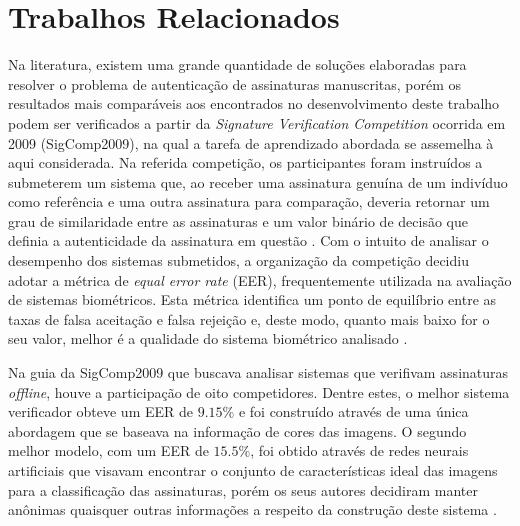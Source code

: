 
\chapter{Trabalhos Relacionados} \label{cap:trab-rel}

Na literatura, existem uma grande quantidade de soluções elaboradas para resolver o problema de autenticação de assinaturas manuscritas, porém os resultados mais comparáveis aos encontrados no desenvolvimento deste trabalho podem ser verificados a partir da \emph{Signature Verification Competition} ocorrida em 2009 (SigComp2009), na qual a tarefa de aprendizado abordada se assemelha à aqui considerada. Na referida competição, os participantes foram instruídos a submeterem um sistema que, ao receber uma assinatura genuína de um indivíduo como referência e uma outra assinatura para comparação, deveria retornar um grau de similaridade entre as assinaturas e um valor binário de decisão que definia a autenticidade da assinatura em questão \cite{icdar2009}. Com o intuito de analisar o desempenho dos sistemas submetidos, a organização da competição decidiu adotar a métrica de \emph{equal error rate} (EER), frequentemente utilizada na avaliação de sistemas biométricos. Esta métrica identifica um ponto de equilíbrio entre as taxas de falsa aceitação e falsa rejeição e, deste modo, quanto mais baixo for o seu valor, melhor é a qualidade do sistema biométrico analisado \cite{capsi}.

Na guia da SigComp2009 que buscava analisar sistemas que verifivam assinaturas \emph{offline}, houve a participação de oito competidores. Dentre estes, o melhor sistema verificador obteve um EER de $9.15\%$ e foi construído através de uma única abordagem que se baseava na informação de cores das imagens. O segundo melhor modelo, com um EER de $15.5\%$, foi obtido através de redes neurais artificiais que visavam encontrar o conjunto de características ideal das imagens para a classificação das assinaturas, porém os seus autores decidiram manter anônimas quaisquer outras informações a respeito da construção deste sistema \cite{icdar2009, volker}.

